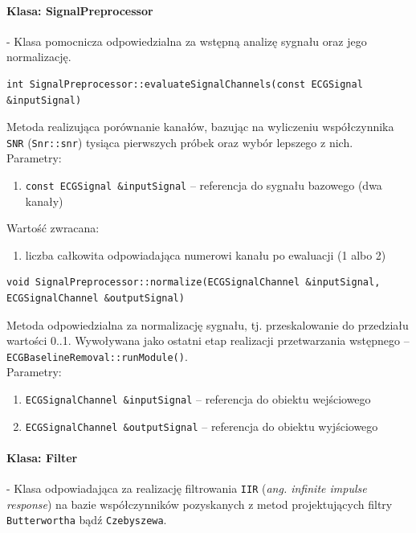 \documentclass[a4paper, 11pt]{article}
\begin{document}
\paragraph{Klasa: SignalPreprocessor}
- Klasa pomocnicza odpowiedzialna za wstępną analizę sygnału oraz jego normalizację.

\begin{lstlisting}
int SignalPreprocessor::evaluateSignalChannels(const ECGSignal &inputSignal)
\end{lstlisting}
Metoda realizująca porównanie kanałów, bazując na wyliczeniu współczynnika \verb|SNR| (\verb|Snr::snr|) tysiąca pierwszych próbek oraz wybór lepszego z nich. \\

Parametry:
\begin{enumerate}
\item \verb|const ECGSignal &inputSignal|  -- referencja do sygnału bazowego (dwa kanały)
\end{enumerate}
Wartość zwracana:
\begin{enumerate}
\item liczba całkowita odpowiadająca numerowi kanału po ewaluacji (1 albo 2)
\end{enumerate} 

\begin{lstlisting}
void SignalPreprocessor::normalize(ECGSignalChannel &inputSignal, 
ECGSignalChannel &outputSignal)
\end{lstlisting}
Metoda odpowiedzialna za normalizację sygnału, tj. przeskalowanie do przedziału wartości 0..1. Wywoływana jako ostatni etap realizacji przetwarzania wstępnego  -- \verb|ECGBaselineRemoval::runModule()|.\\
Parametry:
\begin{enumerate}
\item \verb|ECGSignalChannel &inputSignal|  -- referencja do obiektu wejściowego
\item \verb|ECGSignalChannel &outputSignal|  -- referencja do obiektu wyjściowego
\end{enumerate}

\paragraph{Klasa: Filter}
- Klasa odpowiadająca za realizację filtrowania \verb|IIR| (\textit{ang. infinite impulse response}) na bazie współczynników pozyskanych z metod projektujących filtry \verb|Butterwortha| bądź \verb|Czebyszewa|. 
\end{document}
